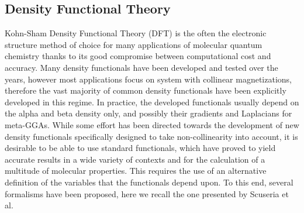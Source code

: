 \documentclass[12pt]{article}
\begin{document}
\subsection{Density Functional Theory}
Kohn-Sham Density Functional Theory (DFT) is the often the electronic structure method of choice for many applications of molecular quantum chemistry thanks to its good compromise between computational cost and accuracy.
Many density functionals have been developed and tested over the years, however most applications focus on system with collinear magnetizations, therefore the vast majority of common density functionals have been explicitly developed in this regime.
In practice, the developed functionals usually depend on the alpha and beta density only, and possibly their gradients and Laplacians for meta-GGAs.
While some effort has been directed towards the development of new density functionals specifically designed to take non-collinearity into account,\cite{Gross13_156401} it is desirable to be able to use standard functionals, which have proved to yield accurate results in a wide variety of contexts and for the calculation of a multitude of molecular properties.
This requires the use of an alternative definition of the variables that the functionals depend upon.
To this end, several formalisms have been proposed,\cite{vanWullen02_779,Frisch07_125119,Frisch12_2193,Scuseria13_035117,Liu04_6658,Liu05_241102,Liu03_597,Liu05_054102,Liu13_3741} here we recall the one presented by Scuseria et al.\cite{Frisch07_125119,Frisch12_2193,Scuseria13_035117}
\end{document}
